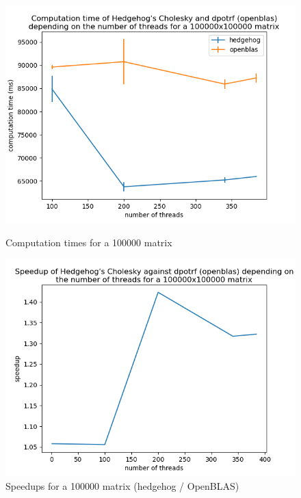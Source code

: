 \begin{figure}[!htb]
  \begin{minipage}{0.48\linewidth}
    \centering
    \includegraphics[scale=0.5]{img/cho-img/times-100000.png}
    \caption{Computation times for a 100000 matrix}
    \label{fig:time100000}
  \end{minipage}\hfill
  \begin{minipage}{0.48\linewidth}
    \centering
    \includegraphics[scale=0.5]{img/cho-img/speedup-100000.png}
    \caption{Speedups for a 100000 matrix (hedgehog / OpenBLAS)}
    \label{fig:speedups100000}
  \end{minipage}
\end{figure}

